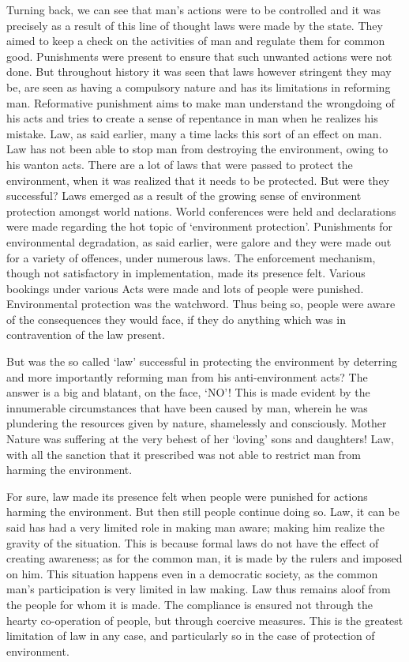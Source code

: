 \begin{multicols}{2}
\noi
Turning back, we can see that man’s actions were to be controlled and it was precisely as a
result of this line of thought laws were made by the state. They aimed to keep a check on the
activities of man and regulate them for common good. Punishments were present to ensure that
such unwanted actions were not done. But throughout history it was seen that laws however
stringent they may be, are seen as having a compulsory nature and has its limitations in
reforming man. Reformative punishment aims to make man understand the wrongdoing of his
acts and tries to create a sense of repentance in man when he realizes his mistake. Law, as said
earlier, many a time lacks this sort of an effect on man. Law has not been able to stop man
from destroying the environment, owing to his wanton acts. There are a lot of laws that were
passed to protect the environment, when it was realized that it needs to be protected. But were
they successful? Laws emerged as a result of the growing sense of environment protection
amongst world nations. World conferences were held and declarations were made regarding
the hot topic of ‘environment protection’. Punishments for environmental degradation, as said
earlier, were galore and they were made out for a variety of offences, under numerous laws.
The enforcement mechanism, though not satisfactory in implementation, made its presence
felt. Various bookings under various Acts were made and lots of people were punished.
Environmental protection was the watchword. Thus being so, people were aware of the
consequences they would face, if they do anything which was in contravention of the law
present.


\noi
But was the so called ‘law’ successful in protecting the environment by deterring and more
importantly reforming man from his anti-environment acts? The answer is a big and blatant, on the face, ‘NO’! This is made evident by the innumerable circumstances that have been
caused by man, wherein he was plundering the resources given by nature, shamelessly and
consciously. Mother Nature was suffering at the very behest of her ‘loving’ sons and daughters!
Law, with all the sanction that it prescribed was not able to restrict man from harming the
environment.

\noi
For sure, law made its presence felt when people were punished for actions harming the
environment. But then still people continue doing so. Law, it can be said has had a very limited
role in making man aware; making him realize the gravity of the situation. This is because
formal laws do not have the effect of creating awareness; as for the common man, it is made
by the rulers and imposed on him. This situation happens even in a democratic society, as the
common man’s participation is very limited in law making. Law thus remains aloof from the
people for whom it is made. The compliance is ensured not through the hearty co-operation of
people, but through coercive measures. This is the greatest limitation of law in any case, and
particularly so in the case of protection of environment.


\end{multicols}
